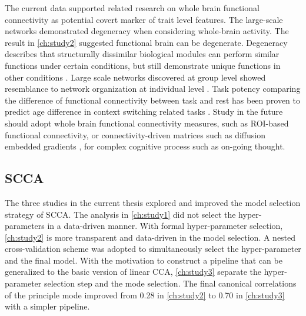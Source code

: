 The current data supported related research on whole brain functional connectivity as potential covert marker of trait level features. The large-scale networks demonstrated degeneracy when considering whole-brain activity. The result in \cref{ch:study2} suggested functional brain can be degenerate. Degeneracy describes that structurally dissimilar biological modules can perform similar functions under certain conditions, but still demonstrate unique functions in other conditions \cite{Buckner2013}. Large scale networks discovered at group level showed resemblance to network organization at individual level \cite{Finn2015}. Task potency comparing the difference of functional connectivity between task and rest has been proven to predict age difference in context switching related tasks \cite{Chauvin2018}. Study in the future should adopt whole brain functional connectivity measures, such as ROI-based functional connectivity, or connectivity-driven matrices such as diffusion embedded gradients \cite{Margulies2016,Marquand2017}, for complex cognitive process such as on-going thought.

\subsection{SCCA}
%

The three studies in the current thesis explored and improved the model selection strategy of SCCA. The analysis in \cref{ch:study1} did not select the hyper-parameters in a data-driven manner. With formal hyper-parameter selection, \cref{ch:study2} is more transparent and data-driven in the model selection. A nested cross-validation scheme was adopted to simultaneously select the hyper-parameter and the final model. With the motivation to construct a pipeline that can be generalized to the basic version of linear CCA, \cref{ch:study3} separate the hyper-parameter selection step and the mode selection. The final canonical correlations of the principle mode improved from 0.28 in \cref{ch:study2} to 0.70 in \cref{ch:study3} with a simpler pipeline. 

